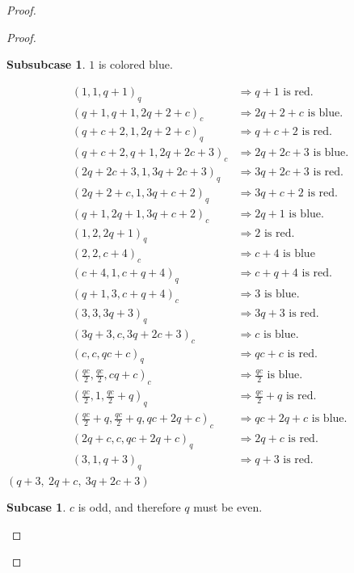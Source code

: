 \documentclass[preprint,12pt]{elsarticle}
\theoremstyle{plain}
\theoremstyle{definition}
\newtheorem{subcase}{Subcase}[case]
\newtheorem{subsubcase}{Subsubcase}[subcase]
\begin{document}
\begin{proof}
\begin{proof}
\begin{subsubcase}
    $1$ is colored blue.
\end{subsubcase}
\begingroup
\setlength{\jot}{2pt}
\begin{align*}
(1,1,q+1)_q&\Longrightarrow q+1 \text{ is red.}\\
(q+1,q+1,2q+2+c)_c&\Longrightarrow 2q+2+c \text{ is blue.}\\
(q+c+2,1,2q+2+c)_q&\Longrightarrow q+c+2 \text{ is red.}\\
(q+c+2,q+1,2q+2c+3)_c&\Longrightarrow 2q+2c+3 \text{ is blue.}\\
(2q+2c+3,1,3q+2c+3)_q&\Longrightarrow 3q+2c+3 \text{ is red.}\\
(2q+2+c,1,3q+c+2)_q&\Longrightarrow 3q+c+2 \text{ is red.}\\
(q+1,2q+1,3q+c+2)_c&\Longrightarrow 2q+1 \text{ is blue.}\\
(1,2,2q+1)_q&\Longrightarrow 2 \text{ is red.}\\
(2,2,c+4)_c&\Longrightarrow c+4 \text{ is blue}\\
(c+4,1,c+q+4)_q&\Longrightarrow c+q+4 \text{ is red.}\\
(q+1,3,c+q+4)_c&\Longrightarrow 3 \text{ is blue.}\\
(3,3,3q+3)_q&\Longrightarrow 3q+3 \text{ is red.}\\
(3q+3,c,3q+2c+3)_c&\Longrightarrow c \text{ is blue.}\\
(c,c,qc+c)_q&\Longrightarrow qc+c \text{ is red.}\\
(\tfrac{qc}{2},\tfrac{qc}{2},cq+c)_c&\Longrightarrow \tfrac{qc}{2} \text{ is blue.}\\
(\tfrac{qc}{2},1,\tfrac{qc}{2}+q)_q&\Longrightarrow \tfrac{qc}{2}+q \text{ is red.}\\
(\tfrac{qc}{2}+q,\tfrac{qc}{2}+q,qc+2q+c)_c&\Longrightarrow qc+2q+c \text{ is blue.}\\
(2q+c,c,qc+2q+c)_q&\Longrightarrow 2q+c \text{ is red.}\\
(3,1,q+3)_q&\Longrightarrow q+3 \text{ is red.}
\end{align*}
$(q+3,\ 2q+c,\ 3q+2c+3)$
\endgroup

\begin{subcase}
    $c$ is odd, and therefore $q$ must be even.
\end{subcase}




\end{proof}
\end{proof}
\end{document}
